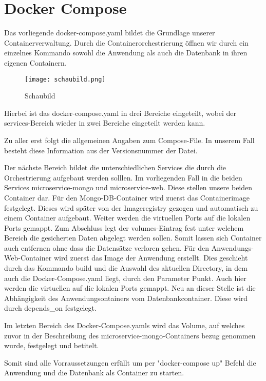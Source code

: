 
\chapter{Docker Compose}
\label{ch:Docker Compose}
Das vorliegende docker-compose.yaml bildet die Grundlage unserer Containerverwaltung. Durch die Containerorchestrierung öffnen wir durch ein einzelnes Kommando sowohl die Anwendung als auch die Datenbank in ihren eigenen Containern.

\begin{wrapfigure}{r}{0\textwidth}
\centering
\texttt{[image: schaubild.png]}
\vspace{5pt}
\caption{Schaubild\footnotemark}
\label{fig:blueant}
\end{wrapfigure}


Hierbei ist das docker-compose.yaml in drei Bereiche eingeteilt, wobei der services-Bereich wieder in zwei Bereiche eingeteilt werden kann.

Zu aller erst folgt die allgemeinen Angaben zum Compose-File. In unserem Fall besteht diese Information aus der Versionsnummer der Datei.

Der nächste Bereich bildet die unterschiedlichen Services die durch die Orchestrierung aufgebaut werden solllen. Im vorliegenden Fall in die beiden Services \glqq  microservice-mongo\grqq{} und \glqq  microservice-web\grqq{}. Diese stellen unsere beiden Container dar. 
Für den Mongo-DB-Container wird zuerst das Containerimage festgelegt. Dieses wird später von der Imageregistry gezogen und automatisch zu einem Container aufgebaut. Weiter werden die virtuellen Ports auf die lokalen Ports gemappt. Zum Abschluss legt der volumes-Eintrag fest unter welchem Bereich die gesicherten Daten abgelegt werden sollen. Somit lassen sich Container auch entfernen ohne dass die Datensätze verloren gehen.
Für den Anwendungs-Web-Container wird zuerst das Image der Anwendung erstellt. Dies geschieht durch das Kommando build und die Auswahl des aktuellen Directory, in dem auch die Docker-Compose.yaml liegt, durch den Parameter \glqq  Punkt\grqq{}. Auch hier werden die virtuellen auf die lokalen Ports gemappt. Neu an dieser Stelle ist die Abhängigkeit des Anwendungsontainers vom Datenbankcontainer. Diese wird durch \glqq  depends\_on\grqq{} festgelegt.

Im letzten Bereich des Docker-Compose.yamls wird das Volume, auf welches zuvor in der Beschreibung des \glqq  microservice-mongo\grqq{}-Containers bezug genommen wurde, festgelegt und betitelt.

Somit sind alle Vorraussetzungen erfüllt um per "docker-compose up" Befehl die Anwendung und die Datenbank als Container zu starten.